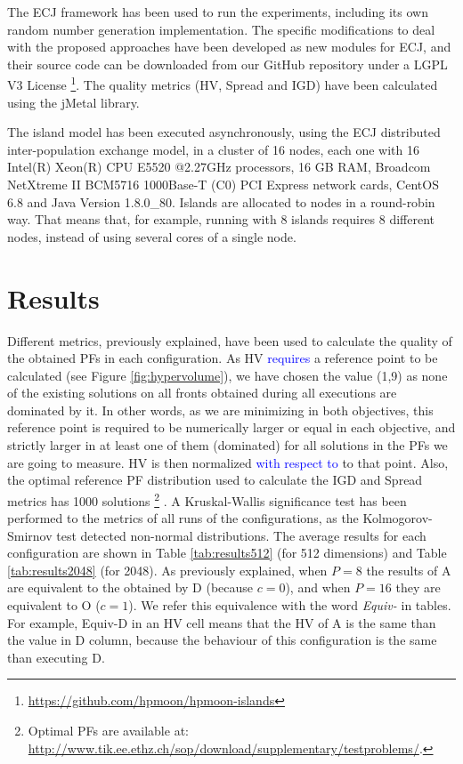 \documentclass[preprint]{elsarticle}
\begin{document}
The ECJ framework \citep{ECJ} has been used to run the
experiments, including its own random number generation implementation.  The specific modifications to deal with the proposed approaches have been developed as new modules for
ECJ, and their source code can be downloaded from our GitHub repository under a
LGPL V3 License
\footnote{\url{https://github.com/hpmoon/hpmoon-islands}}. The quality metrics (HV, Spread and IGD) have been calculated using the jMetal \cite{Durillo11Jmetal} library.

The
island model has been executed asynchronously, using the ECJ distributed inter-population exchange
 model, in a cluster of 16 nodes, each one with 16 Intel(R) Xeon(R) CPU E5520
@2.27GHz processors, 16 GB RAM, Broadcom NetXtreme II BCM5716 1000Base-T (C0) PCI Express network cards, CentOS 6.8 and Java Version 1.8.0\_80. Islands are allocated to nodes in a round-robin way. That means that, for example, running with 8 islands requires 8 different nodes, instead of using several cores of a single node.

\section{Results}
\label{sec:results}


Different metrics, previously explained, have been used
to calculate the quality of the obtained PFs in each configuration. As HV \textcolor{blue}{requires} a reference point to be
calculated (see Figure \ref{fig:hypervolume}), we have chosen the value (1,9) as none of the existing solutions on all fronts obtained during all executions are dominated by it. In other words, as we are minimizing in both objectives, this reference point is required to be numerically larger or equal in each objective, and strictly larger in at least one of them (dominated) for all solutions in the PFs we are going to measure. HV is then
normalized \textcolor{blue}{with respect to} to that point. Also, the optimal reference PF distribution used to calculate the IGD and Spread metrics \cite{Durillo11Jmetal} has 1000 solutions \footnote{Optimal PFs are available at:   \url{http://www.tik.ee.ethz.ch/sop/download/supplementary/testproblems/}.} .  
A Kruskal-Wallis significance
test has been performed to the metrics of all runs of the
configurations, as the Kolmogorov-Smirnov test detected non-normal
distributions. The average results for each configuration are shown in
Table \ref{tab:results512} (for 512 dimensions) and Table
\ref{tab:results2048} (for 2048). As previously explained, when $P=8$
the results of A are equivalent to the obtained by D (because
$c=0$), and when $P=16$ they are equivalent to O ($c=1$). We refer this equivalence with the word {\em Equiv-} in tables. For example, Equiv-D in an HV cell  means that the HV of A is the same than the value in D column, because the behaviour of this configuration is the same than executing D.
\end{document}

